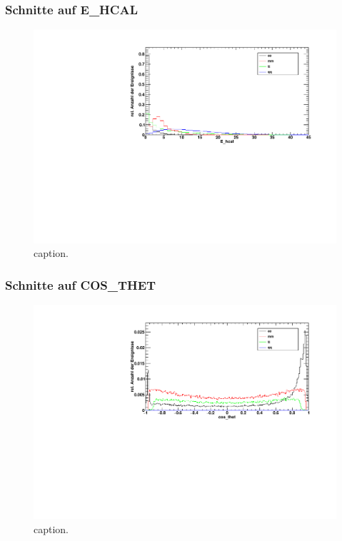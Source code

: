 \subsubsection*{Schnitte auf E\_HCAL}

\begin{figure}[H]
\begin{center}
  \includegraphics[width=\textwidth]{../img/dist_E_hcal.pdf}
  \caption{caption.}
  \label{img:dist_E_hcal}
\end{center}
\end{figure} 

\subsubsection*{Schnitte auf COS\_THET}

\begin{figure}[H]
\begin{center}
  \includegraphics[width=\textwidth]{../img/dist_cos_thet.pdf}
  \caption{caption.}
  \label{img:dist_cos_thet}
\end{center}
\end{figure} 

